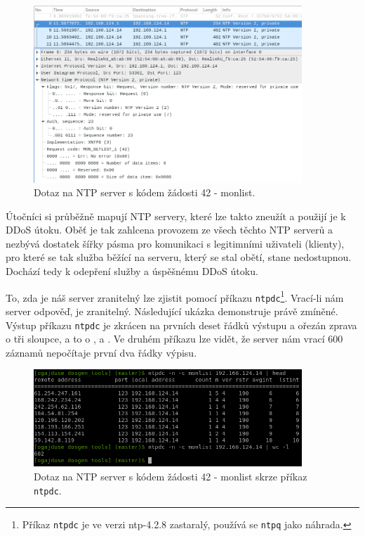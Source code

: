 \begin{figure} [ht]
	\centering
	\includegraphics[width=0.9\textwidth]{obrazky/mon_getlist_1_wireshark.png}
	\caption{Dotaz na NTP server s kódem žádosti 42 - monlist.}
	\label{fig:monlist_get_wireshark-img}
\end{figure}

Útočníci si průběžně mapují NTP servery, které lze takto zneužít a použijí je k 
DDoS útoku.
Oběť je tak zahlcena provozem ze všech těchto NTP serverů a nezbývá dostatek šířky
pásma pro komunikaci s legitimními uživateli (klienty), pro které se tak služba běžící na
serveru, který se stal obětí, stane nedostupnou. Dochází tedy k odepření služby a úspěšnému
DDoS útoku.

To, zda je náš server zranitelný lze zjistit pomocí příkazu \texttt{ntpdc}\footnote{Příkaz
\texttt{ntpdc} je ve verzi ntp-4.2.8 zastaralý, používá se \texttt{ntpq} jako náhrada.}.
Vrací-li nám server odpověď, je zranitelný. Následující ukázka demonstruje právě zmíněné.
Výstup příkazu \texttt{ntpdc} je zkrácen na prvních deset řádků výstupu a ořezán zprava o
tři sloupce, a to o ,  a . Ve druhém příkazu lze vidět, že
server nám vrací 600 záznamů nepočítaje první dva řádky výpisu.


%
\begin{figure} [ht]
	\centering
	\includegraphics[width=0.9\textwidth]{obrazky/ntpdc_monlist_terminal_screen.png}
	\caption{Dotaz na NTP server s kódem žádosti 42 - monlist skrze příkaz \texttt{ntpdc}.}
	\label{fig:monlist_get_terminal-img}
\end{figure}

